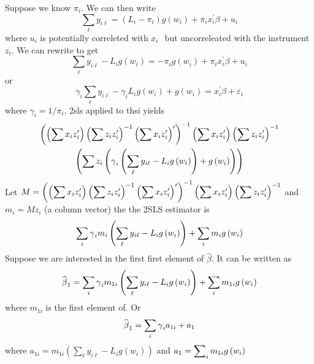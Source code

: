 \documentclass[12pt]{article}
\begin{document}
Suppose we know $\pi _{i}$. We can then write%
\begin{equation}
\sum_{\ell }y_{i\ell }=\left( L_{i}-\pi _{i}\right) g\left( w_{i}\right)
+\pi _{i}x_{i}^{\prime }\beta +u_{i}
\end{equation}%
where $u_{i}$ is potentially correleted with $x_{i}\ $\ but uncorreleated
with the instrument $z_{i}$. We can rewrite to get%
\begin{equation}
\sum_{\ell }y_{i\ell }-L_{i}g\left( w_{i}\right) =-\pi _{i}g\left(
w_{i}\right) +\pi _{i}x_{i}^{\prime }\beta +u_{i}
\end{equation}%
or
\begin{equation*}
\gamma _{i}\sum_{\ell }y_{i\ell }-\gamma _{i}L_{i}g\left( w_{i}\right)
+g\left( w_{i}\right) =x_{i}^{\prime }\beta +\varepsilon _{i}
\end{equation*}%
where $\gamma _{i}=1/\pi _{i}$. 2sls applied to thsi yields%
\begin{multline*}
\left( \left( \dsum x_{i}z_{i}^{\prime }\right) \left( \dsum
z_{i}z_{i}^{\prime }\right) ^{-1}\left( \dsum x_{i}z_{i}^{\prime }\right)
^{\prime }\right) ^{-1}\left( \dsum x_{i}z_{i}^{\prime }\right) \left( \dsum
z_{i}z_{i}^{\prime }\right) ^{-1} \\
\left( \dsum z_{i}\left( \gamma _{i}\left( \sum_{\ell }y_{i\ell
}-L_{i}g\left( w_{i}\right) \right) +g\left( w_{i}\right) \right) \right)
\end{multline*}%
Let $M=\left( \left( \mathop{\displaystyle \sum } x_{i}z_{i}^{\prime }\right) \left( \mathop{\displaystyle \sum }
z_{i}z_{i}^{\prime }\right) ^{-1}\left( \mathop{\displaystyle \sum } x_{i}z_{i}^{\prime }\right)
^{\prime }\right) ^{-1}\left( \mathop{\displaystyle \sum } x_{i}z_{i}^{\prime }\right) \left( \mathop{\displaystyle \sum }
z_{i}z_{i}^{\prime }\right) ^{-1}$ and $m_{i}=Mz_{i}$ (a column vector) the
the 2SLS estimator is%
\begin{equation*}
\dsum_{i}\gamma _{i}m_{i}\left( \sum_{\ell }y_{i\ell }-L_{i}g\left(
w_{i}\right) \right) +\dsum_{i}m_{i}g\left( w_{i}\right)
\end{equation*}%
Suppose we are interested in the first first element of $\widehat{\beta }$.
It can be written as
\begin{equation*}
\widehat{\beta }_{1}=\dsum_{i}\gamma _{i}m_{1i}\left( \sum_{\ell }y_{i\ell
}-L_{i}g\left( w_{i}\right) \right) +\dsum_{i}m_{1i}g\left( w_{i}\right)
\end{equation*}%
where $m_{1i}$ is the first element of. Or%
\begin{equation*}
\widehat{\beta }_{1}=\dsum_{i}\gamma _{i}a_{1i}+a_{1}
\end{equation*}%
where $a_{1i}=m_{1i}\left( \sum_{\ell }y_{i\ell }-L_{i}g\left( w_{i}\right)
\right) $ and $a_{1}=\mathop{\displaystyle \sum }_{i}m_{1i}g\left( w_{i}\right) $
\end{document}
